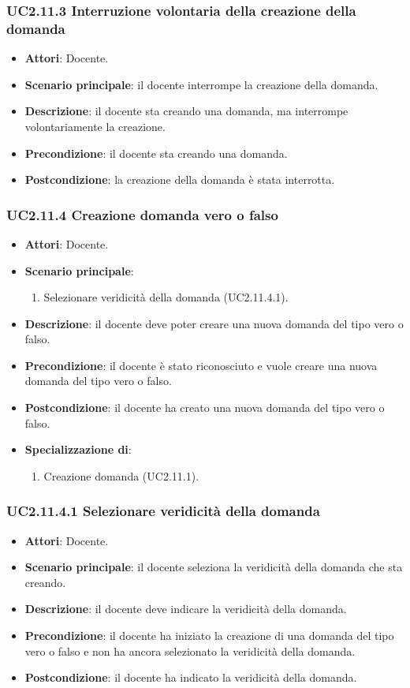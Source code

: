 \subsubsection{UC2.11.3 Interruzione volontaria della creazione della domanda}
\begin{itemize}
\item \textbf{Attori}: Docente.
\item \textbf{Scenario principale}: il docente interrompe la creazione della domanda.
\item \textbf{Descrizione}: il docente sta creando una domanda, ma interrompe volontariamente la creazione.
\item \textbf{Precondizione}: il docente sta creando una domanda.
\item \textbf{Postcondizione}: la creazione della domanda è stata interrotta.
\end{itemize}
\subsubsection{UC2.11.4 Creazione domanda vero o falso}
\begin{itemize}
\item \textbf{Attori}: Docente.
\item \textbf{Scenario principale}:
\begin{enumerate}
\item Selezionare veridicità della domanda (UC2.11.4.1).
\end{enumerate}
\item \textbf{Descrizione}: il docente deve poter creare una nuova domanda del tipo vero o falso.
\item \textbf{Precondizione}: il docente è stato riconosciuto e vuole creare una nuova domanda del tipo vero o falso.
\item \textbf{Postcondizione}: il docente ha creato una nuova domanda del tipo vero o falso.
\item \textbf{Specializzazione di}:
\begin{enumerate}
\item Creazione domanda (UC2.11.1).
\end{enumerate}
\end{itemize}
\subsubsection{UC2.11.4.1 Selezionare veridicità della domanda}
\begin{itemize}
\item \textbf{Attori}: Docente.
\item \textbf{Scenario principale}: il docente seleziona la veridicità della domanda che sta creando.
\item \textbf{Descrizione}: il docente deve indicare la veridicità della domanda.
\item \textbf{Precondizione}: il docente ha iniziato la creazione di una domanda del tipo vero o falso e non ha ancora selezionato la veridicità della domanda.
\item \textbf{Postcondizione}: il docente ha indicato la veridicità della domanda.
\end{itemize}
